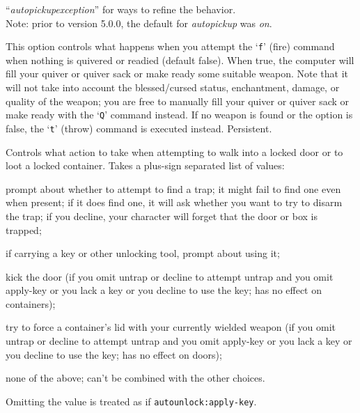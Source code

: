 \documentclass[titlepage]{article}
\begin{document}
\begin{description}[font=\mdseries\itshape]
``\textit{autopickup\textunderscore exception}'' for ways to refine the behavior.
\\
Note: prior to version 5.0.0, the default for \textit{autopickup} was \textit{on}.
\item[autoquiver]
This option controls what happens when you attempt the `\texttt{f}' (fire)
command when nothing is quivered or readied (default false).
When true, the computer will fill
your quiver or quiver sack or make ready some suitable weapon.
Note that it will not take
into account the blessed/cursed status, enchantment, damage, or
quality of the weapon; you are free to manually fill your quiver
or quiver sack or make ready
with the `\texttt{Q}' command instead.
If no weapon is found or the option is
false, the `\texttt{t}' (throw) command is executed instead.  Persistent.
\item[autounlock]
Controls what action to take when attempting to walk into a locked door
or to loot a locked container.
Takes a plus-sign separated list of values:
\newlength{\auwidth}
\addtolength{\auwidth}{\labelsep}
\begin{description}[leftmargin=\auwidth, topsep=1mm, itemsep=0mm, labelwidth=*, font=\ttfamily, align=right]
\item[Untrap]
prompt about whether to attempt to find a trap;
it might fail to find one even when present; if it does find one, it
will ask whether you want to try to disarm the trap; if you decline,
your character will forget that the door or box is trapped;
\item[Apply-Key]
if carrying a key or other unlocking tool, prompt about using it;
\item[Kick]
kick the door (if you omit untrap or decline to attempt untrap and
you omit apply-key or you lack a key or you decline to use the key;
has no effect on containers);
\item[Force]
try to force a container's lid with your currently
wielded weapon (if you omit untrap or decline to attempt untrap and
you omit apply-key or you lack a key or you decline to use the key;
has no effect on doors);
\item[None]
none of the above; can't be combined with the other choices.
\end{description}
Omitting the value is treated as if \texttt{autounlock:apply-key}.

\end{description}
\end{document}

